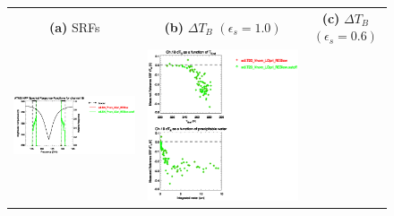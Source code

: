 \begin{figure}[H]
  \centering
  \begin{tabular}{c c c}
    \textsf{\textbf{(a)} SRFs} &
    \textsf{\textbf{(b)} $\Delta T_B$ $(\epsilon_s = 1.0)$} &
    \textsf{\textbf{(c)} $\Delta T_B$ $(\epsilon_s = 0.6)$} \\
    \includegraphics[bb=80 400 280 558,clip,scale=0.85]{graphics/srf/Rset/atms_npp.ch18.osrf.eps} &
    \includegraphics[bb=85 400 260 558,clip,scale=0.85]{graphics/dtb/Rset/e1.0_r0.0/atms_npp.ch18.dTb.eps} & 

\end{tabular}
\end{figure}
